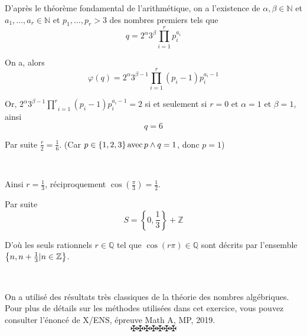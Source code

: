 D'apr{\`e}s le th{\'e}or{\`e}me fondamental de l'arithm{\'e}tique, on a
l'existence de $\alpha, \beta \in \mathbb{N}$ et $a_1, \ldots, a_r \in
\mathbb{N}$ et $p_1, \ldots, p_r > 3$ des nombres premiers tels que
\[ q = 2^{\alpha} 3^{\beta} \underset{}{\overset{}{}} \underset{i =
   1}{\overset{r}{\prod}} p^{a_i}_i \]


On a, alors
\[ \varphi (q) = 2^{\alpha} 3^{\beta - 1} \underset{i = 1}{\overset{r}{\prod}}
   (p_i - 1) p^{a_i - 1}_i \]


Or, $2^{\alpha} 3^{\beta - 1} \underset{i = 1}{\overset{r}{\prod}} (p_i - 1)
p^{a_i - 1}_i = 2$ si et seulement si $r = 0$ et $\alpha = 1$ et $\beta = 1$,
ainsi
\[ q = 6 \]


Par suite $\frac{r}{2} = \frac{1}{6}$. (Car $p \in \{ 1, 2, 3 \} \operatorname{avec} p
\wedge q = 1$, donc $p = 1$)

\

Ainsi $r = \frac{1}{3}$, r{\'e}ciproquement $\cos \left( \frac{\pi}{3}
\right) = \frac{1}{2}$.

Par suite
\[ S = \left\{ 0, \frac{1}{3} \right\} +\mathbb{Z} \]


D'o{\`u} les seuls rationnels $r \in \mathbb{Q}$ tel que $\cos (r \pi) \in
\mathbb{Q}$ sont d{\'e}crits par l'ensemble $\left\{ n, n + \frac{1}{3} | n
\in \mathbb{Z}  \right\}$.

\


On a utilis{\'e} des r{\'e}sultats tr{\`e}s classiques de la th{\'e}orie des
nombres alg{\'e}briques. Pour plus de d{\'e}tails sur les m{\'e}thodes
utilis{\'e}es dans cet exercice, vous pouvez consulter l'{\'e}nonc{\'e} de
X/ENS, {\'e}preuve Math A, MP, 2019.
\[ \maltese \maltese \maltese \maltese \maltese \maltese \maltese \]
